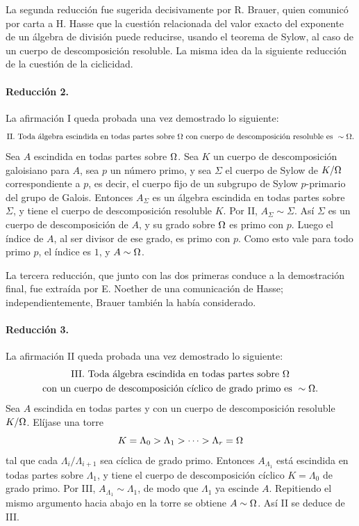 La segunda reducción fue sugerida decisivamente por R. Brauer, quien comunicó por carta a H. Hasse que la cuestión relacionada del valor exacto del exponente de un álgebra de división puede reducirse, usando el teorema de Sylow, al caso de un cuerpo de descomposición resoluble. La misma idea da la siguiente reducción de la cuestión de la ciclicidad.

\paragraph{Reducción 2.}
La afirmación I queda probada una vez demostrado lo siguiente:
\[
\text{II. Toda álgebra escindida en todas partes sobre }\Omega\text{ con cuerpo de descomposición resoluble es } \sim\Omega .
\]
Sea \(A\) escindida en todas partes sobre \(\Omega\). Sea \(K\) un cuerpo de descomposición galoisiano para \(A\), sea \(p\) un número primo, y sea \(\Sigma\) el cuerpo de Sylow de \(K/\Omega\) correspondiente a \(p\), es decir, el cuerpo fijo de un subgrupo de Sylow \(p\)-primario del grupo de Galois. Entonces \(A_\Sigma\) es un álgebra escindida en todas partes sobre \(\Sigma\), y tiene el cuerpo de descomposición resoluble \(K\). Por II, \(A_\Sigma\sim\Sigma\). Así \(\Sigma\) es un cuerpo de descomposición de \(A\), y su grado sobre \(\Omega\) es primo con \(p\). Luego el índice de \(A\), al ser divisor de ese grado, es primo con \(p\). Como esto vale para todo primo \(p\), el índice es \(1\), y \(A\sim\Omega\).

La tercera reducción, que junto con las dos primeras conduce a la demostración final, fue extraída por E. Noether de una comunicación de Hasse; independientemente, Brauer también la había considerado.

\paragraph{Reducción 3.}
La afirmación II queda probada una vez demostrado lo siguiente:
\[
\begin{gathered}
\text{III. Toda álgebra escindida en todas partes sobre }\Omega\\
\text{con un cuerpo de descomposición cíclico de grado primo es } \sim\Omega .
\end{gathered}
\]
Sea \(A\) escindida en todas partes y con un cuerpo de descomposición resoluble \(K/\Omega\). Elíjase una torre
\[
        K=\Lambda_0>\Lambda_1>\cdots>\Lambda_r=\Omega
\]
tal que cada \(\Lambda_i/\Lambda_{i+1}\) sea cíclica de grado primo. Entonces \(A_{\Lambda_1}\) está escindida en todas partes sobre \(\Lambda_1\), y tiene el cuerpo de descomposición cíclico \(K=\Lambda_0\) de grado primo. Por III, \(A_{\Lambda_1}\sim\Lambda_1\), de modo que \(\Lambda_1\) ya escinde \(A\). Repitiendo el mismo argumento hacia abajo en la torre se obtiene \(A\sim\Omega\). Así II se deduce de III.

